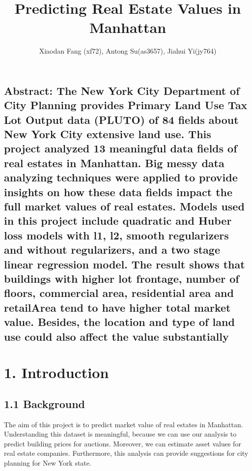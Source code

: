 \documentclass[9pt,twocolumn,twoside]{pnas-new}
\begin{document}
\title{Predicting Real Estate Values in Manhattan}
\author{Xiaodan Fang (xf72), Antong Su(as3657), Jiahui Yi(jy764)}


\verticaladjustment{-2pt}

\maketitle
\thispagestyle{firststyle}

\subsection*{Abstract: The New York City Department of City Planning provides Primary Land Use Tax Lot Output data (PLUTO) of 84 fields about New York City extensive land use. This project analyzed 13 meaningful data fields of real estates in Manhattan.  Big messy data analyzing techniques were applied to provide insights on how these data fields impact the full market values of real estates. Models used in this project include quadratic and Huber loss models with l1, l2, smooth regularizers and without regularizers, and a two stage linear regression model. The result shows that buildings with higher lot frontage, number of floors, commercial area, residential area and retailArea tend to have higher total market value. Besides, the location and type of land use could also affect the value substantially
%
}

\section*{1. Introduction}
\subsection*{1.1 Background}
The aim of this project is to predict market value of real estates in  Manhattan. Understanding this dataset is meaningful, because we can use our analysis to predict building prices for auctions. Moreover, we can estimate asset values for real estate companies. Furthermore, this analysis can provide suggestions for city planning for New York state.
\end{document}
